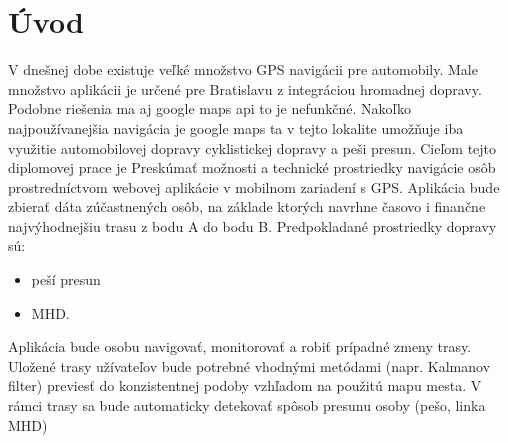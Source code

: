 \chapter{Úvod}\label{chap:intro}

V dnešnej dobe existuje veľké množstvo GPS navigácii pre automobily. Male množstvo
aplikácii je určené pre Bratislavu z integráciou hromadnej dopravy. Podobne riešenia ma aj
google maps api to je nefunkčné. Nakoľko najpoužívanejšia navigácia je google maps ta
v tejto lokalite umožňuje iba využitie automobilovej dopravy cyklistickej dopravy a peši
presun. Cieľom tejto diplomovej prace je Preskúmať možnosti a technické prostriedky
navigácie osôb prostredníctvom webovej aplikácie v mobilnom zariadení s GPS.
Aplikácia bude zbierať dáta zúčastnených osôb, na základe ktorých navrhne časovo i
finančne najvýhodnejšiu trasu z bodu A do bodu B.
Predpokladané prostriedky dopravy sú:

\begin{itemize}
	\item peší presun
	\item MHD.
\end{itemize}
Aplikácia bude osobu navigovať, monitorovať a robiť prípadné zmeny trasy.
Uložené trasy užívateľov bude potrebné vhodnými metódami (napr. Kalmanov filter)
previesť do konzistentnej podoby vzhľadom na použitú mapu mesta.
V rámci trasy sa bude automaticky detekovať spôsob presunu osoby (pešo, linka MHD)